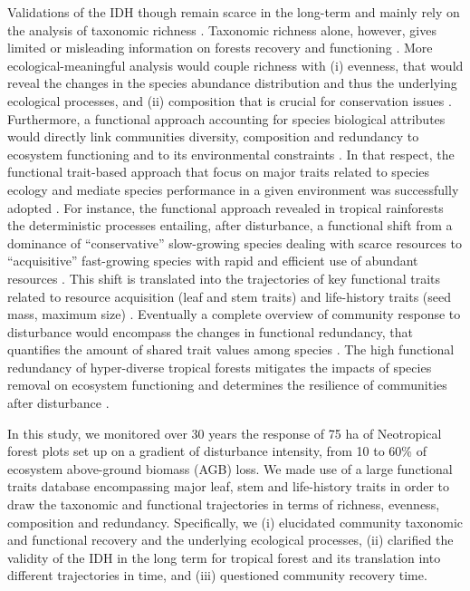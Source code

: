 \documentclass[
  11pt,
  french,
  A4paper,
  extrafontsizes,onecolumn,openright
  ]{memoir}
\begin{document}
Validations of the IDH though remain scarce in the long-term and mainly
rely on the analysis of taxonomic richness \autocite{Molino2001}.
Taxonomic richness alone, however, gives limited or misleading
information on forests recovery and functioning
\autocite{Chaudhary2016}. More ecological-meaningful analysis would
couple richness with (i) evenness, that would reveal the changes in the
species abundance distribution and thus the underlying ecological
processes, and (ii) composition that is crucial for conservation issues
\autocite{Lavorel2002}. Furthermore, a functional approach accounting
for species biological attributes would directly link communities
diversity, composition and redundancy to ecosystem functioning and to
its environmental constraints \autocite{Violle2007b}. In that respect,
the functional trait-based approach that focus on major traits related
to species ecology and mediate species performance in a given
environment was successfully adopted \autocite{Diaz2005}. For instance,
the functional approach revealed in tropical rainforests the
deterministic processes entailing, after disturbance, a functional shift
from a dominance of ``conservative'' slow-growing species dealing with
scarce resources to ``acquisitive'' fast-growing species with rapid and
efficient use of abundant resources \autocite{Reich2014}. This shift is
translated into the trajectories of key functional traits related to
resource acquisition (leaf and stem traits) and life-history traits
(seed mass, maximum size)
\autocites{Wright2004}{TerSteege2006}{Westoby2006a}{Chave2009}.
Eventually a complete overview of community response to disturbance
would encompass the changes in functional redundancy, that quantifies
the amount of shared trait values among species \autocite{Carmona2016}.
The high functional redundancy of hyper-diverse tropical forests
\autocite{Bellwood2006} mitigates the impacts of species removal on
ecosystem functioning and determines the resilience of communities after
disturbance \autocites{Elmqvist2003}{Diaz2005}.

In this study, we monitored over 30 years the response of 75 ha of
Neotropical forest plots set up on a gradient of disturbance intensity,
from 10 to 60\% of ecosystem above-ground biomass (AGB) loss. We made
use of a large functional traits database encompassing major leaf, stem
and life-history traits in order to draw the taxonomic and functional
trajectories in terms of richness, evenness, composition and redundancy.
Specifically, we (i) elucidated community taxonomic and functional
recovery and the underlying ecological processes, (ii) clarified the
validity of the IDH in the long term for tropical forest and its
translation into different trajectories in time, and (iii) questioned
community recovery time.
\end{document}
